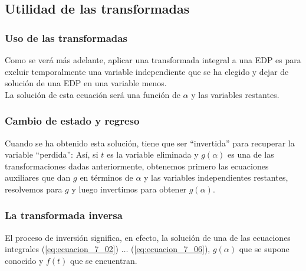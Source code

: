 \documentclass[12pt]{beamer}
\begin{document}
\subsection{Utilidad de las transformadas}

\begin{frame}
\frametitle{Uso de las transformadas}
Como se verá más adelante, aplicar una transformada integral a una EDP es para excluir temporalmente una variable independiente que se ha elegido y dejar de solución de una EDP en una variable menos.
\\
\bigskip
\pause
La solución de esta ecuación será una función de $\alpha$ y las variables restantes.
\end{frame}
\begin{frame}
\frametitle{Cambio de estado y regreso}
Cuando se ha obtenido esta solución, tiene que ser \enquote{invertida} para recuperar la variable \enquote{perdida}: \pause Así, si $t$ es la variable eliminada y $g (\alpha)$ es una de las transformaciones dadas anteriormente, \pause obtenemos primero las ecuaciones auxiliares que dan $g$ en términos de $\alpha$ y las variables independientes restantes, resolvemos para $g$ y luego invertimos para obtener $g (\alpha)$.
\end{frame}
\begin{frame}
\frametitle{La transformada inversa}
El proceso de inversión significa, en efecto, la solución de una de las ecuaciones integrales (\ref{eq:ecuacion_7_02}) $\ldots$ (\ref{eq:ecuacion_7_06}), $g (\alpha)$ que se supone conocido y $f (t)$ que se encuentran.
\end{frame}
\end{document}
